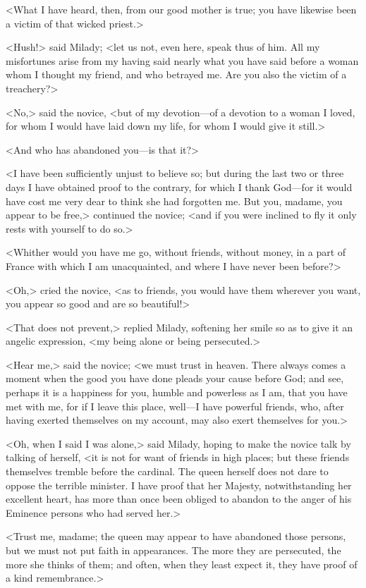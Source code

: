 <What I have heard, then, from our good mother is true; you have likewise been a victim of that wicked priest.> 

<Hush!> said Milady; <let us not, even here, speak thus of him. All my misfortunes arise from my having said nearly what you have said before a woman whom I thought my friend, and who betrayed me. Are you also the victim of a treachery?> 

<No,> said the novice, <but of my devotion---of a devotion to a woman I loved, for whom I would have laid down my life, for whom I would give it still.> 

<And who has abandoned you---is that it?> 

<I have been sufficiently unjust to believe so; but during the last two or three days I have obtained proof to the contrary, for which I thank God---for it would have cost me very dear to think she had forgotten me. But you, madame, you appear to be free,> continued the novice; <and if you were inclined to fly it only rests with yourself to do so.> 

<Whither would you have me go, without friends, without money, in a part of France with which I am unacquainted, and where I have never been before?> 

<Oh,> cried the novice, <as to friends, you would have them wherever you want, you appear so good and are so beautiful!> 

<That does not prevent,> replied Milady, softening her smile so as to give it an angelic expression, <my being alone or being persecuted.> 

<Hear me,> said the novice; <we must trust in heaven. There always comes a moment when the good you have done pleads your cause before God; and see, perhaps it is a happiness for you, humble and powerless as I am, that you have met with me, for if I leave this place, well---I have powerful friends, who, after having exerted themselves on my account, may also exert themselves for you.> 

<Oh, when I said I was alone,> said Milady, hoping to make the novice talk by talking of herself, <it is not for want of friends in high places; but these friends themselves tremble before the cardinal. The queen herself does not dare to oppose the terrible minister. I have proof that her Majesty, notwithstanding her excellent heart, has more than once been obliged to abandon to the anger of his Eminence persons who had served her.> 

<Trust me, madame; the queen may appear to have abandoned those persons, but we must not put faith in appearances. The more they are persecuted, the more she thinks of them; and often, when they least expect it, they have proof of a kind remembrance.> 

